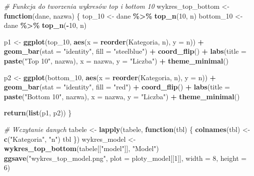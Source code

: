 \documentclass[
]{article}
\newenvironment{Shaded}{\begin{snugshade}}{\end{snugshade}}
\newcommand{\AttributeTok}[1]{\textcolor[rgb]{0.13,0.29,0.53}{#1}}
\newcommand{\CommentTok}[1]{\textcolor[rgb]{0.56,0.35,0.01}{\textit{#1}}}
\newcommand{\ControlFlowTok}[1]{\textcolor[rgb]{0.13,0.29,0.53}{\textbf{#1}}}
\newcommand{\DecValTok}[1]{\textcolor[rgb]{0.00,0.00,0.81}{#1}}
\newcommand{\FunctionTok}[1]{\textcolor[rgb]{0.13,0.29,0.53}{\textbf{#1}}}
\newcommand{\NormalTok}[1]{#1}
\newcommand{\OtherTok}[1]{\textcolor[rgb]{0.56,0.35,0.01}{#1}}
\newcommand{\SpecialCharTok}[1]{\textcolor[rgb]{0.81,0.36,0.00}{\textbf{#1}}}
\newcommand{\StringTok}[1]{\textcolor[rgb]{0.31,0.60,0.02}{#1}}
\begin{document}
\begin{Shaded}
\begin{Highlighting}[]
\CommentTok{\# Funkcja do tworzenia wykresów top i bottom 10}
\NormalTok{wykres\_top\_bottom }\OtherTok{\textless{}{-}} \ControlFlowTok{function}\NormalTok{(dane, nazwa) \{}
\NormalTok{  top\_10 }\OtherTok{\textless{}{-}}\NormalTok{ dane }\SpecialCharTok{\%\textgreater{}\%} \FunctionTok{top\_n}\NormalTok{(}\DecValTok{10}\NormalTok{, n)}
\NormalTok{  bottom\_10 }\OtherTok{\textless{}{-}}\NormalTok{ dane }\SpecialCharTok{\%\textgreater{}\%} \FunctionTok{top\_n}\NormalTok{(}\SpecialCharTok{{-}}\DecValTok{10}\NormalTok{, n)}
  
\NormalTok{  p1 }\OtherTok{\textless{}{-}} \FunctionTok{ggplot}\NormalTok{(top\_10, }\FunctionTok{aes}\NormalTok{(}\AttributeTok{x =} \FunctionTok{reorder}\NormalTok{(Kategoria, n), }\AttributeTok{y =}\NormalTok{ n)) }\SpecialCharTok{+}
    \FunctionTok{geom\_bar}\NormalTok{(}\AttributeTok{stat =} \StringTok{"identity"}\NormalTok{, }\AttributeTok{fill =} \StringTok{"steelblue"}\NormalTok{) }\SpecialCharTok{+}
    \FunctionTok{coord\_flip}\NormalTok{() }\SpecialCharTok{+}
    \FunctionTok{labs}\NormalTok{(}\AttributeTok{title =} \FunctionTok{paste}\NormalTok{(}\StringTok{"Top 10"}\NormalTok{, nazwa), }\AttributeTok{x =}\NormalTok{ nazwa, }\AttributeTok{y =} \StringTok{"Liczba"}\NormalTok{) }\SpecialCharTok{+}
    \FunctionTok{theme\_minimal}\NormalTok{()}
  
\NormalTok{  p2 }\OtherTok{\textless{}{-}} \FunctionTok{ggplot}\NormalTok{(bottom\_10, }\FunctionTok{aes}\NormalTok{(}\AttributeTok{x =} \FunctionTok{reorder}\NormalTok{(Kategoria, n), }\AttributeTok{y =}\NormalTok{ n)) }\SpecialCharTok{+}
    \FunctionTok{geom\_bar}\NormalTok{(}\AttributeTok{stat =} \StringTok{"identity"}\NormalTok{, }\AttributeTok{fill =} \StringTok{"red"}\NormalTok{) }\SpecialCharTok{+}
    \FunctionTok{coord\_flip}\NormalTok{() }\SpecialCharTok{+}
    \FunctionTok{labs}\NormalTok{(}\AttributeTok{title =} \FunctionTok{paste}\NormalTok{(}\StringTok{"Bottom 10"}\NormalTok{, nazwa), }\AttributeTok{x =}\NormalTok{ nazwa, }\AttributeTok{y =} \StringTok{"Liczba"}\NormalTok{) }\SpecialCharTok{+}
    \FunctionTok{theme\_minimal}\NormalTok{()}
  
  \FunctionTok{return}\NormalTok{(}\FunctionTok{list}\NormalTok{(p1, p2))}
\NormalTok{\}}

\CommentTok{\# Wczytanie danych}
\NormalTok{tabele }\OtherTok{\textless{}{-}} \FunctionTok{lapply}\NormalTok{(tabele, }\ControlFlowTok{function}\NormalTok{(tbl) \{}
  \FunctionTok{colnames}\NormalTok{(tbl) }\OtherTok{\textless{}{-}} \FunctionTok{c}\NormalTok{(}\StringTok{"Kategoria"}\NormalTok{, }\StringTok{"n"}\NormalTok{)}
\NormalTok{  tbl}
\NormalTok{\})}
\NormalTok{wykres\_model }\OtherTok{\textless{}{-}} \FunctionTok{wykres\_top\_bottom}\NormalTok{(tabele[[}\StringTok{"model"}\NormalTok{]], }\StringTok{"Model"}\NormalTok{)}
\FunctionTok{ggsave}\NormalTok{(}\StringTok{"wykres\_top\_model.png"}\NormalTok{, }\AttributeTok{plot =}\NormalTok{ ploty\_model[[}\DecValTok{1}\NormalTok{]], }\AttributeTok{width =} \DecValTok{8}\NormalTok{, }\AttributeTok{height =} \DecValTok{6}\NormalTok{)}
\end{Highlighting}
\end{Shaded}
\end{document}
